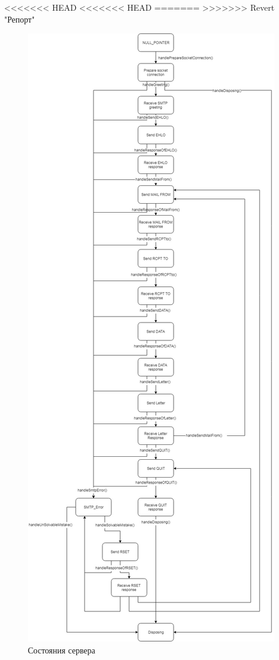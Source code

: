 \documentclass[a4paper,12pt]{report}
\begin{document}
<<<<<<< HEAD
<<<<<<< HEAD
=======
>>>>>>> Revert "Репорт"
\begin{figure}
\centering
\includegraphics[height=\textheight]{static/ClientDiagram_Final.jpg}
\caption{Состояния сервера}
\label{fig:fsm}
\end{figure}
\end{document}
